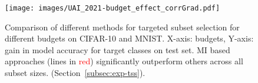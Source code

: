 \documentclass{article}
\begin{document}
\begin{figure}%
    \centering 
  \texttt{[image: images/UAI\_2021-budget\_effect\_corrGrad.pdf]}
\caption{Comparison of different methods for targeted subset selection for different budgets on CIFAR-10 and MNIST. X-axis: budgets, Y-axis: gain in model accuracy for target classes on test set. MI based approaches (lines in {\textcolor{red}{red})} significantly outperform others across all subset sizes. (Section~\ref{subsec:exp-tss}).}

\label{fig:gain-size}
\end{figure}




\end{document}

